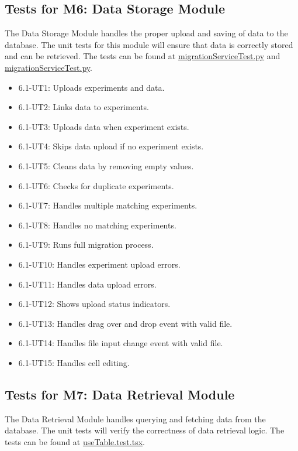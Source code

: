 \documentclass[12pt, titlepage]{article}
\begin{document}
\subsection{Tests for M6: Data Storage Module}

The Data Storage Module handles the proper upload and saving of data to the
database. The unit tests for this module will ensure that data is correctly
stored and can be retrieved. The tests can be found at
\href{https://github.com/SumanyaG/Alkalytics/blob/main/src/backend/test/migrationServiceTest.py}{migrationServiceTest.py}
and
\href{https://github.com/SumanyaG/Alkalytics/blob/main/src/frontend/test/components/upload}{migrationServiceTest.py}.

\begin{itemize}
  \item 6.1-UT1: Uploads experiments and data.
  \item 6.1-UT2: Links data to experiments.
  \item 6.1-UT3: Uploads data when experiment exists.
  \item 6.1-UT4: Skips data upload if no experiment exists.
  \item 6.1-UT5: Cleans data by removing empty values.
  \item 6.1-UT6: Checks for duplicate experiments.
  \item 6.1-UT7: Handles multiple matching experiments.
  \item 6.1-UT8: Handles no matching experiments.
  \item 6.1-UT9: Runs full migration process.
  \item 6.1-UT10: Handles experiment upload errors.
  \item 6.1-UT11: Handles data upload errors.
  \item 6.1-UT12: Shows upload status indicators.
  \item 6.1-UT13: Handles drag over and drop event with valid file.
  \item 6.1-UT14: Handles file input change event with valid file.
  \item 6.1-UT15: Handles cell editing.
\end{itemize}

\subsection{Tests for M7: Data Retrieval Module}

The Data Retrieval Module handles querying and fetching data from the database.
The unit tests will verify the correctness of data retrieval logic. The tests
can be found at
\href{https://github.com/SumanyaG/Alkalytics/blob/main/src/frontend/test/hooks/useTable.test.tsx}{useTable.test.tsx}.
\end{document}
